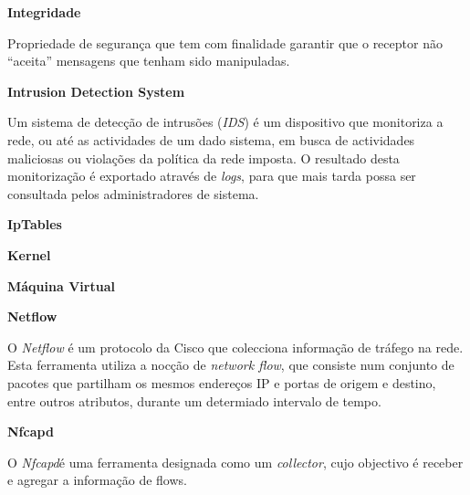 \begin{description}
    \item \textbf{Integridade}

    Propriedade de segurança que tem com finalidade garantir que o receptor não “aceita” mensagens que tenham sido manipuladas.
\end{description}

\begin{description}
    \item \textbf{Intrusion Detection System}
    
    Um sistema de detecção de intrusões (\textit{IDS}) é um dispositivo que monitoriza a rede, ou até as actividades de um dado sistema, em busca de actividades maliciosas ou violações da política da rede imposta. O resultado desta monitorização é exportado através de \textit{logs}, para que mais tarda possa ser consultada pelos administradores de sistema.
\end{description}

\begin{description}
    \item \textbf{IpTables}
\end{description}

\begin{description}
    \item \textbf{Kernel}
\end{description}

\begin{description}
    \item \textbf{Máquina Virtual}
\end{description}

\begin{description}
    \item \textbf{Netflow}

O \textit{Netflow} é um protocolo da Cisco que colecciona informação de tráfego na rede. Esta ferramenta utiliza a nocção de \textit{network flow}, que consiste num conjunto de pacotes que partilham os mesmos endereços IP e portas de origem e destino, entre outros atributos, durante um determiado intervalo de tempo. 
\end{description}

\begin{description}
    \item \textbf{Nfcapd}

O \textit{Nfcapd}é uma ferramenta designada como um \textit{collector}, cujo objectivo é receber e agregar a informação de flows.
\end{description}

